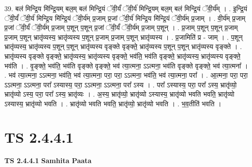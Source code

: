 \documentclass[17pt]{extarticle}
\begin{document}
39. बल॑ मिन्द्रि॒य मि॑न्द्रि॒यम् बल॒म् बल॑ मिन्द्रि॒यं ॅवी॒र्यं॑ ॅवी॒र्य॑ मिन्द्रि॒यम् बल॒म् बल॑ मिन्द्रि॒यं ॅवी॒र्य᳚म् । . इ॒न्द्रि॒यं ॅवी॒र्यं॑ ॅवी॒र्य॑ मिन्द्रि॒य मि॑न्द्रि॒यं ॅवी॒र्य॑म् प्र॒जाम् प्र॒जां ॅवी॒र्य॑ मिन्द्रि॒य मि॑न्द्रि॒यं ॅवी॒र्य॑म् प्र॒जाम् । . वी॒र्य॑म् प्र॒जाम् प्र॒जां ॅवी॒र्यं॑ ॅवी॒र्य॑म् प्र॒जाम् प॒शून् प॒शून् प्र॒जां ॅवी॒र्यं॑ ॅवी॒र्य॑म् प्र॒जाम् प॒शून् । . प्र॒जाम् प॒शून् प॒शून् प्र॒जाम् प्र॒जाम् प॒शून् भ्रातृ॑व्यस्य॒ भ्रातृ॑व्यस्य प॒शून् प्र॒जाम् प्र॒जाम् प॒शून् भ्रातृ॑व्यस्य । . प्र॒जामिति॑ प्र - जाम् । . प॒शून् भ्रातृ॑व्यस्य॒ भ्रातृ॑व्यस्य प॒शून् प॒शून् भ्रातृ॑व्यस्य वृङ्क्ते वृङ्क्ते॒ भ्रातृ॑व्यस्य प॒शून् प॒शून् भ्रातृ॑व्यस्य वृङ्क्ते । . भ्रातृ॑व्यस्य वृङ्क्ते वृङ्क्ते॒ भ्रातृ॑व्यस्य॒ भ्रातृ॑व्यस्य वृङ्क्ते॒ भव॑ति॒ भव॑ति वृङ्क्ते॒ भ्रातृ॑व्यस्य॒ भ्रातृ॑व्यस्य वृङ्क्ते॒ भव॑ति । . वृ॒ङ्क्ते॒ भव॑ति॒ भव॑ति वृङ्क्ते वृङ्क्ते॒ भव॑ त्या॒त्मना॒ ऽऽत्मना॒ भव॑ति वृङ्क्ते वृङ्क्ते॒ भव॑ त्या॒त्मना᳚ । . भव॑ त्या॒त्मना॒ ऽऽत्मना॒ भव॑ति॒ भव॑ त्या॒त्मना॒ परा॒ परा॒ ऽऽत्मना॒ भव॑ति॒ भव॑ त्या॒त्मना॒ परा᳚ । . आ॒त्मना॒ परा॒ परा॒ ऽऽत्मना॒ ऽऽत्मना॒ परा᳚ ऽस्यास्य॒ परा॒ ऽऽत्मना॒ ऽऽत्मना॒ परा᳚ ऽस्य । . परा᳚ ऽस्यास्य॒ परा॒ परा᳚ ऽस्य॒ भ्रातृ॑व्यो॒ भ्रातृ॑व्यो ऽस्य॒ परा॒ परा᳚ ऽस्य॒ भ्रातृ॑व्यः । . अ॒स्य॒ भ्रातृ॑व्यो॒ भ्रातृ॑व्यो ऽस्यास्य॒ भ्रातृ॑व्यो भवति भवति॒ भ्रातृ॑व्यो ऽस्यास्य॒ भ्रातृ॑व्यो भवति । . भ्रातृ॑व्यो भवति भवति॒ भ्रातृ॑व्यो॒ भ्रातृ॑व्यो भवति । . भ॒व॒तीति॑ भवति । \newline
\pagebreak
{}
\section*{ TS 2.4.4.1 }

\textbf{TS 2.4.4.1 } \newline
\textbf{Samhita Paata} \newline
\end{document}
